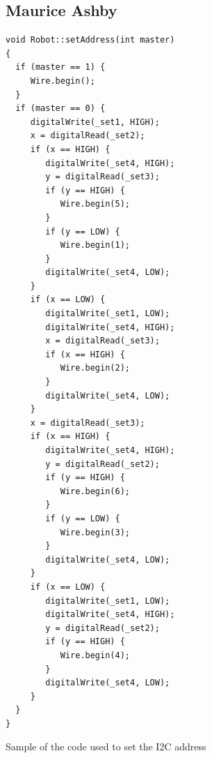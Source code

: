 \documentclass{article}
\begin{document}
\subsection{Maurice Ashby}
\begin{program}
\begin{verbatim}
void Robot::setAddress(int master)
{
  if (master == 1) {
     Wire.begin();
  }
  if (master == 0) {
     digitalWrite(_set1, HIGH);
     x = digitalRead(_set2);
     if (x == HIGH) {
        digitalWrite(_set4, HIGH);
        y = digitalRead(_set3);
        if (y == HIGH) {
           Wire.begin(5);
        }
        if (y == LOW) {
           Wire.begin(1);
        }
        digitalWrite(_set4, LOW);
     }
     if (x == LOW) {
        digitalWrite(_set1, LOW);
        digitalWrite(_set4, HIGH);
        x = digitalRead(_set3);
        if (x == HIGH) {
           Wire.begin(2);
        }
        digitalWrite(_set4, LOW);
     }
     x = digitalRead(_set3);
     if (x == HIGH) {
        digitalWrite(_set4, HIGH);
        y = digitalRead(_set2);
        if (y == HIGH) {
           Wire.begin(6);
        }
        if (y == LOW) {
           Wire.begin(3);
        }
        digitalWrite(_set4, LOW);
     }
     if (x == LOW) {
        digitalWrite(_set1, LOW);
        digitalWrite(_set4, HIGH);
        y = digitalRead(_set2);
        if (y == HIGH) {
           Wire.begin(4);
        }
        digitalWrite(_set4, LOW);
     }
  }
}
\end{verbatim}
\caption{Sample of the code used to set the I2C address}
\label{address}
\end{program}


%
%
%
%

%
%

%
\end{document}
